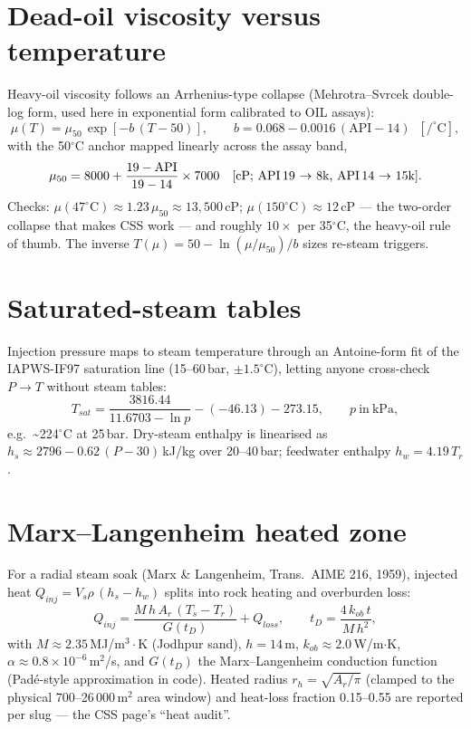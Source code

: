 \documentclass[12pt,a4paper]{report}
\begin{document}
\section{Dead-oil viscosity versus temperature}
Heavy-oil viscosity follows an Arrhenius-type collapse (Mehrotra--Svrcek
double-log form, used here in exponential form calibrated to OIL assays):
\begin{equation}
\mu(T)=\mu_{50}\,\exp[-b\,(T-50)], \qquad
b = 0.068 - 0.0016\,(\mathrm{API}-14)\;\;[/^\circ\mathrm{C}],
\label{eq:mu}
\end{equation}
with the 50$^\circ$C anchor mapped linearly across the assay band,
\begin{equation}
\mu_{50} = 8000 + \frac{19-\mathrm{API}}{19-14}\times7000
\quad\text{[cP; API\,19 $\rightarrow$ 8k, API\,14 $\rightarrow$ 15k]}.
\label{eq:mu50}
\end{equation}
Checks: $\mu(47^\circ\mathrm{C})\approx1.23\,\mu_{50}\approx13{,}500$\,cP;
$\mu(150^\circ\mathrm{C})\approx12$\,cP --- the two-order collapse that makes
CSS work --- and roughly $10\times$ per 35$^\circ$C, the heavy-oil rule of
thumb. The inverse $T(\mu)=50-\ln(\mu/\mu_{50})/b$ sizes re-steam triggers.

\section{Saturated-steam tables}
Injection pressure maps to steam temperature through an Antoine-form fit of the
IAPWS-IF97 saturation line (15--60\,bar, $\pm1.5^\circ$C), letting anyone
cross-check $P\rightarrow T$ without steam tables:
\begin{equation}
T_{sat}=\frac{3816.44}{11.6703-\ln p}-(-46.13)-273.15,
\qquad p\ \mathrm{in\ kPa},
\label{eq:tsat}
\end{equation}
e.g.\ \textasciitilde224$^\circ$C at 25\,bar. Dry-steam enthalpy is linearised
as $h_s \approx 2796-0.62\,(P-30)$\,kJ/kg over 20--40\,bar; feedwater enthalpy
$h_w=4.19\,T_r$.

\section{Marx--Langenheim heated zone}
For a radial steam soak (Marx \& Langenheim, Trans.\ AIME 216, 1959), injected
heat $Q_{inj}=V_s\rho\,(h_s-h_w)$ splits into rock heating and overburden loss:
\begin{equation}
Q_{inj}=\frac{M\,h\,A_r\,(T_s-T_r)}{G(t_D)}+Q_{loss},\qquad
t_D=\frac{4\,k_{ob}\,t}{M\,h^{2}},
\label{eq:ml}
\end{equation}
with $M\approx2.35$\,MJ/m$^3\!\cdot\!$K (Jodhpur sand), $h=14$\,m,
$k_{ob}\approx2.0$\,W/m$\cdot$K, $\alpha\approx0.8\times10^{-6}$\,m$^2$/s, and
$G(t_D)$ the Marx--Langenheim conduction function (Pad\'e-style approximation
in code). Heated radius $r_h=\sqrt{A_r/\pi}$ (clamped to the physical
700--26\,000\,m$^2$ area window) and heat-loss fraction 0.15--0.55 are reported
per slug --- the CSS page's ``heat audit''.
\end{document}
